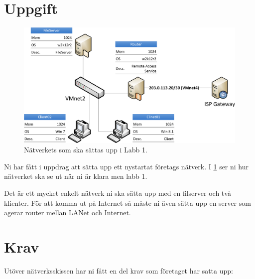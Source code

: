\documentclass[paper=a4, fontsize=11pt]{report} %
\begin{document}
\section{Uppgift}
\begin{figure}[h]
\centering
\includegraphics[width=1\linewidth]{./network}
\caption[Figur över nätverket i labb 1]{Nätverkets som ska sättas upp i Labb 1.}
\label{fig:network}
\end{figure}


Ni har fått i uppdrag att sätta upp ett nystartat företags nätverk. I \figurename  \ref{fig:network} ser ni hur nätverket ska se ut när ni är klara men labb 1.

Det är ett mycket enkelt nätverk ni ska sätta upp med en filserver och två klienter. För att komma ut på Internet så måste ni även sätta upp en server som agerar router mellan LANet och Internet.

\section{Krav}
\label{tasks}
Utöver nätverksskissen har ni fått en del krav som företaget har satta upp:
\end{document}
